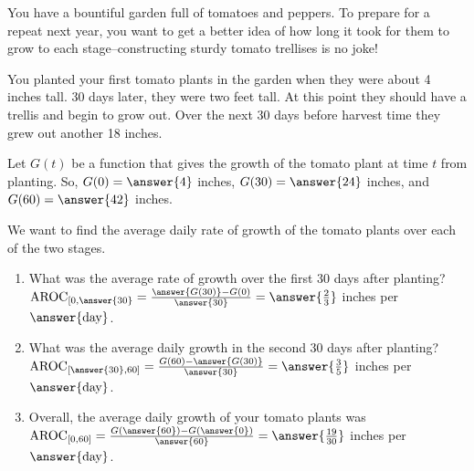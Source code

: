 \documentclass{ximera}
\author{Elizabeth Campolongo}
\begin{document}
\begin{exercise}
You have a bountiful garden full of tomatoes and peppers. To prepare for a repeat next year, you want to get a better idea of how long it took for them to grow to each stage--constructing sturdy tomato trellises is no joke!

You planted your first tomato plants in the garden when they were about 4 inches tall. 30 days later, they were two feet tall. At this point they should have a trellis and begin to grow out. Over the next 30 days before harvest time they grew out another 18 inches. 

Let $G(t)$ be a function that gives the growth of the tomato plant at time $t$ from planting. So, $G(0) = \answer{4}$ inches, $G(30) = \answer{24}$ inches, and $G(60) = \answer{42}$ inches.
%
\begin{exercise}
We want to find the average daily rate of growth of the tomato plants over each of the two stages.
\begin{enumerate}
\item What was the average rate of growth over the first 30 days after planting? \\
$\av_{[0,\answer{30}} = \frac{\answer{G(30)} - G(0)}{\answer{30}} = \answer{\frac{2}{3}}$ inches per $\answer{\text{day}}$.

\item What was the average daily growth in the second 30 days after planting?\\
$\av_{[\answer{30},60]} = \frac{G(60)- \answer{G(30)}}{\answer{30}} = \answer{\frac{3}{5}}$ inches per $\answer{\text{day}}$.

\item Overall, the average daily growth of your tomato plants was \\
$\av_{[0,60]} = \frac{G(\answer{60})- G(\answer{0})}{\answer{60}} = \answer{\frac{19}{30}}$ inches per $\answer{\text{day}}$.


\end{enumerate}
\end{exercise}
\end{exercise}
\end{document}

